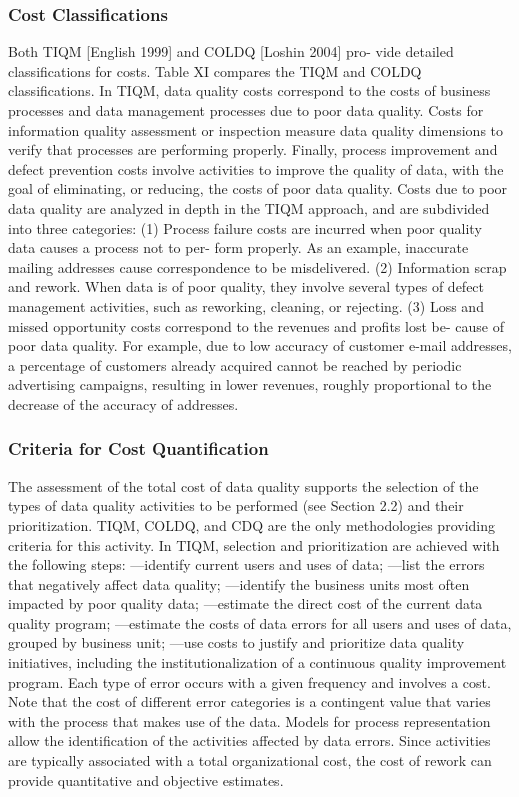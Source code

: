 \documentclass[pdftex,english,oribibl]{llncs}
\begin{document}
    \subsubsection{Cost Classifications}
    Both TIQM [English 1999] and COLDQ [Loshin 2004] pro- vide detailed classifications for costs.
    Table XI compares the TIQM and COLDQ classifications. In TIQM, data quality costs correspond to the costs of business processes and data management processes due to poor data quality. Costs for information quality assessment or inspection measure data quality dimensions to verify that processes are performing properly. Finally, process improvement and defect prevention costs involve activities to improve the quality of data, with the goal of eliminating, or reducing, the costs of poor data quality. Costs due to poor data quality are analyzed in depth in the TIQM approach, and are subdivided into three categories:
    (1) Process failure costs are incurred when poor quality data causes a process not to per- form properly. As an example, inaccurate mailing addresses cause correspondence to be misdelivered.
    (2) Information scrap and rework. When data is of poor quality, they involve several types of defect management activities, such as reworking, cleaning, or rejecting.
    (3) Loss and missed opportunity costs correspond to the revenues and profits lost be- cause of poor data quality. For example, due to low accuracy of customer e-mail addresses, a percentage of customers already acquired cannot be reached by periodic advertising campaigns, resulting in lower revenues, roughly proportional to the decrease of the accuracy of addresses.


    \subsubsection{Criteria for Cost Quantification}
    The assessment of the total cost of data quality supports the selection of the types of data quality activities to be performed (see Section 2.2) and their prioritization. TIQM, COLDQ, and CDQ are the only methodologies providing criteria for this activity. In TIQM, selection and prioritization are achieved with the following steps:
    —identify current users and uses of data;
    —list the errors that negatively affect data quality;
    —identify the business units most often impacted by poor quality data;
    —estimate the direct cost of the current data quality program;
    —estimate the costs of data errors for all users and uses of data, grouped by business unit;
    —use costs to justify and prioritize data quality initiatives, including the institutionalization of a continuous quality improvement program.
    Each type of error occurs with a given frequency and involves a cost. Note that the cost of different error categories is a contingent value that varies with the process that makes use of the data. Models for process representation allow the identification of the activities affected by data errors. Since activities are typically associated with a total organizational cost, the cost of rework can provide quantitative and objective estimates.
\end{document}
